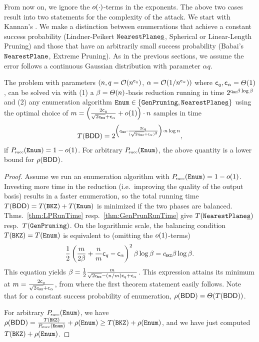 From now on, we ignore the $o(\cdot)$-terms in the exponents. The above two cases result into two statements for the complexity of the \BDD attack. We start with Kannan's \SVP. We make a distinction between enumerations that achieve a constant success probability (Lindner-Peikert $\texttt{NearestPlane\underline{s}}$, Spherical or Linear-Length Pruning) and those that have an arbitrarily small success probability (Babai's $\texttt{NearestPlane}$, Extreme Pruning).
As in the previous sections, we assume the \LWE error follows a continuous Gaussian distribution with parameter $\alpha q$.
\begin{thm} \label{thm:BalanceSuperExp}
	The \LWE problem with parameters $(n, q=\mathcal{O}(n^{\mathsf{c}_q})$, $\alpha = \mathcal{O}(1 / n^{\mathsf{c}_{\alpha}}) )$ where $\mathsf{c}_q, \mathsf{c}_{\alpha} = \varTheta(1)$, can be solved via \BDD with (1) a $\beta=\varTheta(n)$-basis reduction running in time $2^{\cBKZ \beta \log \beta}$ and (2) any enumeration algorithm $\texttt{Enum} \in \{ \texttt{GenPruning}, \texttt{NearestPlane\underline{s}} \}$ using the optimal choice of $m = \left( \frac{2 \cq}{\sqrt{2 \cBKZ}+\ca} + \smallo(1) \right) \cdot n$ samples in time 
\begin{align*}
		T(\BDD) = 2^{ \left( \cBKZ \cdot \frac{2 \cq}{(\sqrt{2 \cBKZ}+\ca)^2} \right) \cdot n \log n},
\end{align*}
	if $P\mkern-4mu_{\mbox{\tiny succ}}(\texttt{Enum}) = 1 - o(1)$. For arbitrary $P\mkern-4mu_{\mbox{\tiny succ}}(\texttt{Enum})$, the above quantity is a lower bound for $\rho(\textsf{BDD})$.
\end{thm}

\begin{proof}
	Assume we run an enumeration algorithm with $P\mkern-4mu_{\mbox{\tiny succ}}(\texttt{Enum}) = 1 - o(1)$. Investing more time in the reduction (i.e.\ improving the quality of the output basis) results in a faster enumeration, so the total running time $T(\textsf{BDD}) = T(\texttt{BKZ})+ T(\texttt{Enum})$ is minimized if the two phases are balanced. Thms.~\ref{thm:LPRunTime} resp.\ \ref{thm:GenPrunRunTime} give $T(\texttt{NearestPlane\underline{s}})$ resp.\ $T(\texttt{GenPruning})$. On the logarithmic scale, the balancing condition $T(\texttt{BKZ}) = T(\texttt{Enum})$ is equivalent to (omitting the $o(1)$-terms)
	\[
		\frac{1}{2} \left( \frac{m}{2 \beta} + \frac{n}{m} \cq - \ca \right)^2 \beta \log \beta = \cBKZ \beta \log \beta.
	\]
	This equation yields $\beta = \frac{1}{2} \frac{m}{\sqrt{2 \cBKZ}-(n/m)\cq + \ca}$. This expression attains its minimum at $m = \frac{2 \cq}{\sqrt{2 \cBKZ} + \ca}$, from where the first theorem statement easily follows. Note that for a constant success probability of enumeration, $\rho(\textsf{BDD}) = \varTheta(T(\textsf{BDD}))$.
	
	For arbitrary $P\mkern-4mu_{\mbox{\tiny succ}}(\texttt{Enum})$, we have $\rho(\textsf{BDD}) = \frac{T(\texttt{BKZ})}{P\mkern-4mu_{\mbox{\tiny succ}}(\texttt{Enum})}+\rho(\texttt{Enum}) \geq T(\texttt{BKZ}) + \rho(\texttt{Enum})$, and we have just computed $T(\texttt{BKZ}) + \rho(\texttt{Enum})$. 
\end{proof}

